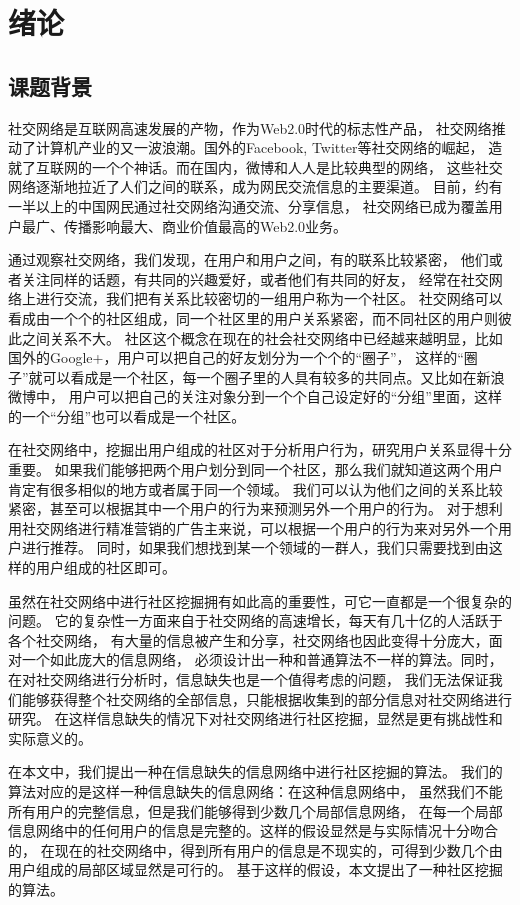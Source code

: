 \chapter{绪论}
\label{chap:intro}

\section{课题背景}

社交网络是互联网高速发展的产物，作为Web2.0时代的标志性产品，
社交网络推动了计算机产业的又一波浪潮。国外的Facebook, Twitter等社交网络的崛起，
造就了互联网的一个个神话。而在国内，微博和人人是比较典型的网络，
这些社交网络逐渐地拉近了人们之间的联系，成为网民交流信息的主要渠道。
目前，约有一半以上的中国网民通过社交网络沟通交流、分享信息，
社交网络已成为覆盖用户最广、传播影响最大、商业价值最高的Web2.0业务。

通过观察社交网络，我们发现，在用户和用户之间，有的联系比较紧密，
他们或者关注同样的话题，有共同的兴趣爱好，或者他们有共同的好友，
经常在社交网络上进行交流，我们把有关系比较密切的一组用户称为一个社区。
社交网络可以看成由一个个的社区组成，同一个社区里的用户关系紧密，而不同社区的用户则彼此之间关系不大。
社区这个概念在现在的社会社交网络中已经越来越明显，比如国外的Google+，用户可以把自己的好友划分为一个个的“圈子”，
这样的“圈子”就可以看成是一个社区，每一个圈子里的人具有较多的共同点。又比如在新浪微博中，
用户可以把自己的关注对象分到一个个自己设定好的“分组”里面，这样的一个“分组”也可以看成是一个社区。

在社交网络中，挖掘出用户组成的社区对于分析用户行为，研究用户关系显得十分重要。
如果我们能够把两个用户划分到同一个社区，那么我们就知道这两个用户肯定有很多相似的地方或者属于同一个领域。
我们可以认为他们之间的关系比较紧密，甚至可以根据其中一个用户的行为来预测另外一个用户的行为。
对于想利用社交网络进行精准营销的广告主来说，可以根据一个用户的行为来对另外一个用户进行推荐。
同时，如果我们想找到某一个领域的一群人，我们只需要找到由这样的用户组成的社区即可。

虽然在社交网络中进行社区挖掘拥有如此高的重要性，可它一直都是一个很复杂的问题。
它的复杂性一方面来自于社交网络的高速增长，每天有几十亿的人活跃于各个社交网络，
有大量的信息被产生和分享，社交网络也因此变得十分庞大，面对一个如此庞大的信息网络，
必须设计出一种和普通算法不一样的算法。同时，在对社交网络进行分析时，信息缺失也是一个值得考虑的问题，
我们无法保证我们能够获得整个社交网络的全部信息，只能根据收集到的部分信息对社交网络进行研究。
在这样信息缺失的情况下对社交网络进行社区挖掘，显然是更有挑战性和实际意义的。

在本文中，我们提出一种在信息缺失的信息网络中进行社区挖掘的算法。
我们的算法对应的是这样一种信息缺失的信息网络：在这种信息网络中，
虽然我们不能所有用户的完整信息，但是我们能够得到少数几个局部信息网络，
在每一个局部信息网络中的任何用户的信息是完整的。这样的假设显然是与实际情况十分吻合的，
在现在的社交网络中，得到所有用户的信息是不现实的，可得到少数几个由用户组成的局部区域显然是可行的。
基于这样的假设，本文提出了一种社区挖掘的算法。

